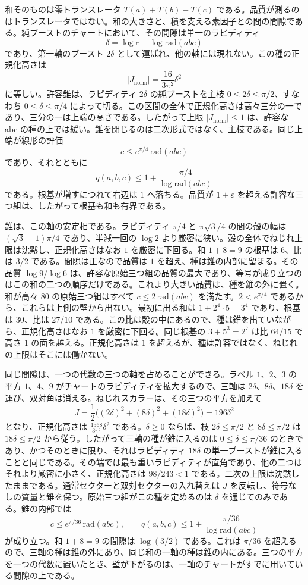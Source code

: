 \documentclass[a4paper]{article}
\theoremstyle{definition}
\theoremstyle{remark}
\newcommand{\Jnorm}{J_{\mathrm{norm}}}
\begin{document}
和そのものは零トランスレータ \(T(a)+T(b)-T(c)\) である。品質が測るのはトランスレータではない。和の大きさと、積を支える素因子との間の間隙である。純ブーストのチャートにおいて、その間隙は単一のラピディティ
\[
\delta=\log c-\log\mathrm{rad}(abc)
\]
であり、第一軸のブースト \(2\delta\) として運ばれ、他の軸には現れない。この種の正規化高さは
\[
|\Jnorm|=\frac{16}{3\pi^2}\delta^2
\]
に等しい。許容錐は、ラピディティ \(2\delta\) の純ブーストを主枝 \(0\le 2\delta\le\pi/2\)、すなわち \(0\le\delta\le\pi/4\) によって切る。この区間の全体で正規化高さは高々三分の一であり、三分の一は上端の高さである。したがって上限 \(|\Jnorm|\le 1\) は、許容な abc の種の上では緩い。錐を閉じるのは二次形式ではなく、主枝である。同じ上端が線形の評価
\[
c\le e^{\pi/4}\,\mathrm{rad}(abc)
\]
であり、それとともに
\[
q(a,b,c)\le 1+\frac{\pi/4}{\log\mathrm{rad}(abc)}
\]
である。根基が増すにつれて右辺は \(1\) へ落ちる。品質が \(1+\varepsilon\) を超える許容な三つ組は、したがって根基も和も有界である。

錐は、この軸の安定相である。ラピディティ \(\pi/4\) と \(\pi\sqrt{3}/4\) の間の殻の幅は \((\sqrt{3}-1)\pi/4\) であり、半減一回の \(\log 2\) より厳密に狭い。殻の全体でねじれ上限は沈黙し、正規化高さはなお \(1\) を厳密に下回る。和 \(1+8=9\) の根基は \(6\)、比は \(3/2\) である。間隙は正なので品質は \(1\) を超え、種は錐の内部に留まる。その品質 \(\log 9/\log 6\) は、許容な原始三つ組の品質の最大であり、等号が成り立つのはこの和の二つの順序だけである。これより大きい品質は、種を錐の外に置く。和が高々 \(80\) の原始三つ組はすべて \(c\le 2\,\mathrm{rad}(abc)\) を満たす。\(2<e^{\pi/4}\) であるから、これらは上側の壁から出ない。最初に出る和は \(1+2^4\cdot 5=3^4\) であり、根基は \(30\)、比は \(27/10\) である。この比は殻の中にあるので、種は錐を出ていながら、正規化高さはなお \(1\) を厳密に下回る。同じ根基の \(3+5^3=2^7\) は比 \(64/15\) で高さ \(1\) の面を越える。正規化高さは \(1\) を超えるが、種は許容ではなく、ねじれの上限はそこには働かない。

同じ間隙は、一つの代数の三つの軸を占めることができる。ラベル \(1\)、\(2\)、\(3\) の平方 \(1\)、\(4\)、\(9\) がチャートのラピディティを拡大するので、三軸は \(2\delta\)、\(8\delta\)、\(18\delta\) を運び、双対角は消える。ねじれスカラーは、その三つの平方を加えて
\[
J=\frac12\bigl((2\delta)^2+(8\delta)^2+(18\delta)^2\bigr)=196\delta^2
\]
となり、正規化高さは \(\frac{1568}{3\pi^2}\delta^2\) である。\(\delta\ge 0\) ならば、枝 \(2\delta\le\pi/2\) と \(8\delta\le\pi/2\) は \(18\delta\le\pi/2\) から従う。したがって三軸の種が錐に入るのは \(0\le\delta\le\pi/36\) のときであり、かつそのときに限り、それはラピディティ \(18\delta\) の単一ブーストが錐に入ることと同じである。その端では最も重いラピディティが直角であり、他の二つはそれより厳密に小さく、正規化高さは \(98/243<1\) である。二次の上限は沈黙したままである。通常セクターと双対セクターの入れ替えは \(J\) を反転し、符号なしの質量と錐を保つ。原始三つ組がこの種を定めるのは \(\delta\) を通じてのみである。錐の内部では
\[
c\le e^{\pi/36}\,\mathrm{rad}(abc),
\qquad
q(a,b,c)\le 1+\frac{\pi/36}{\log\mathrm{rad}(abc)}
\]
が成り立つ。和 \(1+8=9\) の間隙は \(\log(3/2)\) である。これは \(\pi/36\) を超えるので、三軸の種は錐の外にあり、同じ和の一軸の種は錐の内にある。三つの平方を一つの代数に置いたとき、壁が下がるのは、一軸のチャートがすでに用いている間隙の上である。
\end{document}
